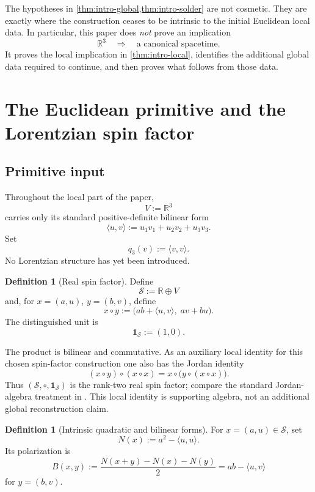 \documentclass[11pt,a4paper]{article}
\theoremstyle{definition}
\newtheorem{definition}[theorem]{Definition}
\theoremstyle{remark}
\newcommand{\R}{\mathbb{R}}
\newcommand{\Smodel}{\mathcal{S}}
\begin{document}
The hypotheses in \cref{thm:intro-global,thm:intro-solder} are not cosmetic.
They are exactly where the construction ceases to be intrinsic to the
initial Euclidean local data.  In particular, this paper does \emph{not}
prove an implication
\[
   \R^{3}\quad\Longrightarrow\quad\text{a canonical spacetime}.
\]
It proves the local implication in \cref{thm:intro-local}, identifies the
additional global data required to continue, and then proves what follows
from those data.

\clearpage
\section{The Euclidean primitive and the Lorentzian spin factor}
\label{sec:local}

\subsection{Primitive input}

Throughout the local part of the paper,
\[
   V:=\R^{3}
\]
carries only its standard positive-definite bilinear form
\[
   \langle u,v\rangle
   :=u_{1}v_{1}+u_{2}v_{2}+u_{3}v_{3}.
\]
Set
\[
   q_{3}(v):=\langle v,v\rangle.
\]
No Lorentzian structure has yet been introduced.

\begin{definition}[Real spin factor]
\label{def:spin-factor}
Define
\[
   \Smodel:=\R\oplus V
\]
and, for \(x=(a,u)\), \(y=(b,v)\), define
\[
   x\circ y
   :=
   \bigl(ab+\langle u,v\rangle,\; av+bu\bigr).
\]
The distinguished unit is
\[
   \mathbf{1}_{\Smodel}:=(1,0).
\]
\end{definition}

The product is bilinear and commutative.  As an auxiliary local identity
for this chosen spin-factor construction one also has the Jordan identity
\[
   (x\circ y)\circ(x\circ x)
   =
   x\circ\bigl(y\circ(x\circ x)\bigr).
\]
Thus \((\Smodel,\circ,\mathbf{1}_{\Smodel})\) is the rank-two real spin
factor; compare the standard Jordan-algebra treatment in
\cite{JordanNeumannWigner,FarautKoranyi}.  This local identity is supporting
algebra, not an additional global reconstruction claim.

\begin{definition}[Intrinsic quadratic and bilinear forms]
\label{def:NSBS}
For \(x=(a,u)\in\Smodel\), set
\[
   N(x):=a^{2}-\langle u,u\rangle.
\]
Its polarization is
\[
   B(x,y)
   :=\frac{N(x+y)-N(x)-N(y)}{2}
   =ab-\langle u,v\rangle
\]
for \(y=(b,v)\).
\end{definition}
\end{document}
